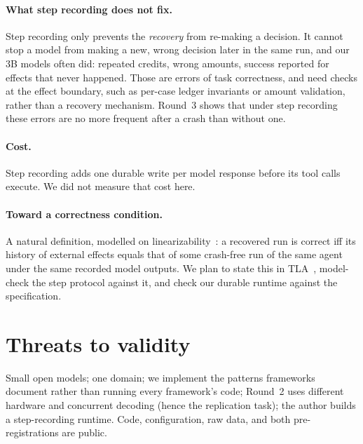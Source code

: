 \documentclass[11pt]{article}
\begin{document}
\paragraph{What step recording does not fix.} Step recording only prevents
the \emph{recovery} from re-making a decision. It cannot stop a model from
making a new, wrong decision later in the same run, and our 3B models often
did: repeated credits, wrong amounts, success reported for effects that
never happened. Those are errors of task correctness, and need checks at the
effect boundary, such as per-case ledger invariants or amount validation,
rather than a recovery mechanism. Round~3 shows that under step recording
these errors are no more frequent after a crash than without one.

\paragraph{Cost.} Step recording adds one durable write per model response
before its tool calls execute. We did not measure that cost here.

\paragraph{Toward a correctness condition.} A natural definition, modelled on
linearizability~\cite{herlihy1990linearizability}: a recovered run is
correct iff its history of external effects equals that of some crash-free
run of the same agent under the same recorded model outputs. We plan to
state this in TLA~\cite{lamport1994tla}, model-check the step protocol
against it, and check our durable runtime against the specification.

\section{Threats to validity}
Small open models; one domain; we implement the patterns frameworks
document rather than running every framework's code; Round~2 uses different
hardware and concurrent decoding (hence the replication task); the author
builds a step-recording runtime. Code, configuration, raw data, and both
pre-registrations are public.
\end{document}
